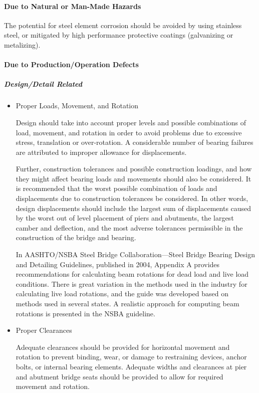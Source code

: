 \paragraph{Due to Natural or Man-Made Hazards}
The potential for steel element corrosion should be avoided by using stainless steel, or mitigated by high
performance protective coatings (galvanizing or metalizing).

\paragraph{Due to Production/Operation Defects}
\subparagraph{Design/Detail Related}
\begin{itemize}
  \item Proper Loads, Movement, and Rotation
  
  Design should take into account proper levels and possible combinations of load, movement, and rotation in order to avoid problems due to excessive stress, translation or over-rotation. A considerable number of bearing failures are attributed to improper allowance for displacements.

  Further, construction tolerances and possible construction loadings, and how they might affect bearing loads and movements should also be considered. It is recommended that the worst possible combination of loads and displacements due to construction tolerances be considered. In other words, design displacements should include the largest sum of displacements caused by the worst out of level placement of piers and abutments, the largest camber and deflection, and the most adverse tolerances permissible in the construction of the bridge and bearing.

  In AASHTO/NSBA Steel Bridge Collaboration—Steel Bridge Bearing Design and Detailing Guidelines, published in 2004, Appendix A provides recommendations for calculating beam rotations for dead load and live load conditions. There is great variation in the methods used in the industry for calculating live load rotations, and the guide was developed based on methods used in several states. A realistic approach for computing beam rotations is presented in the NSBA guideline.
  \item Proper Clearances
  
  Adequate clearances should be provided for horizontal movement and rotation to prevent binding, wear, or damage to restraining devices, anchor bolts, or internal bearing elements. Adequate widths and clearances at pier and abutment bridge seats should be provided to allow for required movement and rotation.
\end{itemize}

